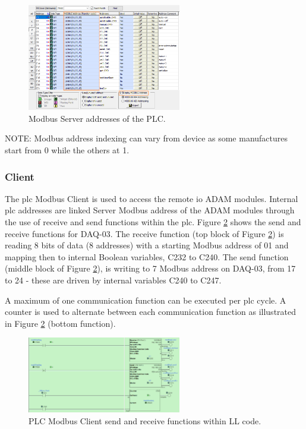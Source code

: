         \begin{figure}[H]
            \centering
            \includegraphics[width = 0.6\textwidth]{2_images/modbusAdd}
            \caption{Modbus Server addresses of the PLC.}
            \label{fig:modbusAdd}
        \end{figure}
        
            NOTE: Modbus address indexing can vary from device as some manufactures start from 0 while the others at 1. 
            
        \subsubsection{Client}
            The \acrshort{plc} Modbus Client is used to access the remote \acrshort{io} ADAM modules. Internal \acrshort{plc} addresses are linked Server Modbus address of the ADAM modules through the use of receive and send functions within the \acrshort{plc}. Figure \ref{fig:plcModbusClient} shows the send and receive functions for DAQ-03. The receive function (top block of Figure \ref{fig:plcModbusClient}) is reading 8 bits of data (8 addresses) with a starting Modbus address of 01 and mapping then to internal Boolean variables, C232 to C240. The send function (middle block of Figure \ref{fig:plcModbusClient}), is writing to 7 Modbus address on DAQ-03, from 17 to 24 - these are driven by internal variables C240 to C247.

            A maximum of one communication function can be executed per \acrshort{plc} cycle. A counter is used to alternate between each communication function as illustrated in Figure \ref{fig:plcModbusClient} (bottom function).

        \begin{figure}[H]
            \centering
            \includegraphics[width = 0.6\textwidth]{2_images/plcModbusClient}
            \caption{PLC Modbus Client send and receive functions within LL code.}
            \label{fig:plcModbusClient}
        \end{figure}
            
